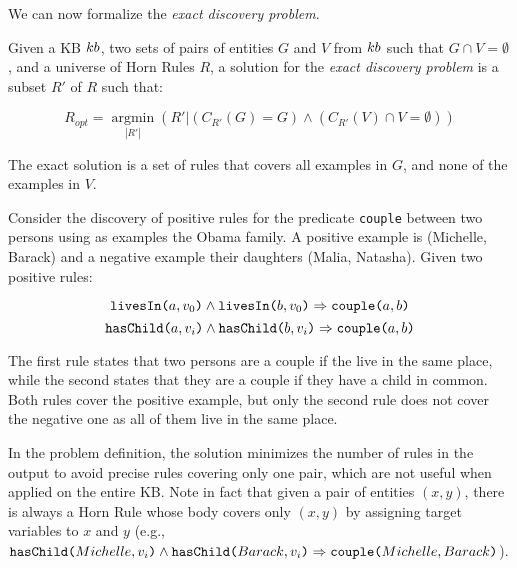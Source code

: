 We can now formalize the \emph{exact discovery problem}.
\begin{definition}
	Given a KB ${\sc kb}$, two sets of pairs of entities $G$ and $V$ from ${\sc kb}$ such that $G \cap V = \emptyset$, and a universe of Horn Rules $R$, a solution for the \emph{exact discovery problem} is a subset $R'$ of $R$  such that:
	
	\vspace{-4mm}	
	\begin{equation*}
		R_{opt}=\underset{|R'|}{\operatorname{argmin}}(R'|(C_{R'}(G) = G) \wedge (C_{R'}(V) \cap V = \emptyset) )	\end{equation*}
	
\end{definition}

The exact solution is a set of rules that covers all examples in $G$, and none of the examples in $V$. 

\begin{example}
	Consider the discovery of positive rules for the predicate {\tt couple} between two persons using as examples the Obama family. A positive example is (Michelle, Barack) and a negative example their daughters (Malia, Natasha). 
	Given two positive rules:
	
	\vspace{-2mm}	
	{\small	
		\begin{equation*}
			\texttt{livesIn(}a,v_0\texttt{)} \wedge \texttt{livesIn(}b,v_0\texttt{)} \Rightarrow  \texttt{couple(}a,b\texttt{)}  
		\end{equation*}
		\begin{equation*}
			\texttt{hasChild(}a,v_i\texttt{)} \wedge \texttt{hasChild(}b,v_i\texttt{)} \Rightarrow  \texttt{couple(}a,b\texttt{)}  
		\end{equation*}
	}
	\vspace{-3mm}	
	
	\noindent
	The first rule states that two persons are a couple if the live in the same place, while the second states that they are a couple if they have a child in common. Both rules cover the positive example, but only the second rule does not cover the negative one as all of them live in the same place. 
\end{example} 

\vspace{1ex}	
In the problem definition, the solution minimizes the number of rules in the output to avoid precise rules covering only one pair, which are not useful when applied on the entire KB. Note in fact that given a pair of entities $(x,y)$, there is always a Horn Rule whose body covers only $(x,y)$ by assigning target variables to $x$ and $y$ (e.g., {\small $\texttt{hasChild(}Michelle,v_i\texttt{)} \wedge \texttt{hasChild(}Barack,v_i\texttt{)} \Rightarrow  \texttt{couple(}Michelle,Barack\texttt{)}$}).


